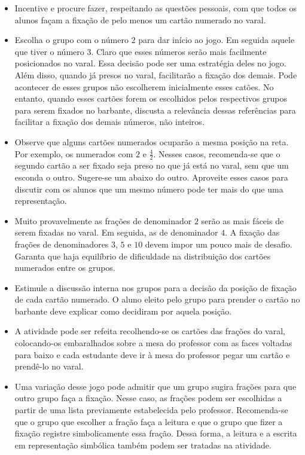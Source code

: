 \begin{multicols}{2}
\begin{itemize}
  \item Incentive e procure fazer, respeitando as questões pessoais, com que todos os alunos façam a fixação de pelo menos um cartão numerado no varal. 
  \item Escolha o grupo com o número $2$ para dar início ao jogo. Em seguida aquele que tiver o número 3. Claro que esses números serão mais facilmente posicionados no varal. Essa decisão pode ser uma estratégia deles no jogo. Além disso, quando já presos no varal, facilitarão a fixação dos demais. Pode acontecer de esses grupos não escolherem inicialmente esses catões. No entanto, quando esses cartões forem os escolhidos pelos respectivos grupos para serem fixados no barbante, discusta a relevância dessas referências para facilitar a fixação dos demais números, não inteiros.      
  \item Observe que alguns cartões numerados ocuparão a mesma posição na reta. Por exemplo, os numerados com $2$ e $\frac{4}{2}$. Nesses casos, recomenda-se que o segundo cartão a ser fixado seja preso no que já está no varal, sem que um esconda o outro. Sugere-se um abaixo do outro. Aproveite esses casos para discutir com os alunos que um mesmo número pode ter mais do que uma representação.
  \item Muito provavelmente as frações de denominador $2$ serão as mais fáceis de serem fixadas no varal. Em seguida, as de denominador $4$. A fixação das frações de denominadores $3$, $5$ e $10$ devem impor um pouco mais de desafio. Garanta que haja equilíbrio de dificuldade na distribuição dos cartões numerados entre os grupos.
  \item Estimule a discussão interna nos grupos para a decisão da posição de fixação de cada cartão numerado. O aluno eleito pelo grupo para prender o cartão no barbante deve explicar como decidiram por aquela posição.
  \item A atividade pode ser refeita recolhendo-se os cartões das frações do varal, colocando-os embaralhados sobre a mesa do professor com as faces voltadas para baixo e cada estudante deve ir à mesa do professor pegar um cartão e prendê-lo no varal.
  \item Uma variação desse jogo pode admitir que um grupo sugira frações para que outro grupo faça a fixação. Nesse caso, as frações podem ser escolhidas a partir de uma lista previamente estabelecida pelo professor. Recomenda-se que o grupo que escolher a fração faça a leitura e que o grupo que fizer a fixação registre simbolicamente essa fração. Dessa forma, a leitura e a escrita em representação simbólica também podem ser tratadas na atividade.
\end{itemize} %


\end{multicols}
